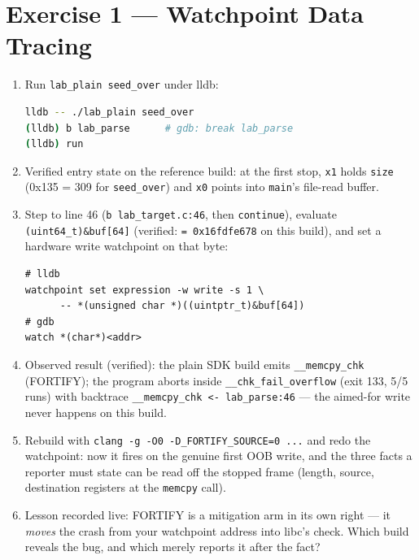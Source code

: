 \documentclass[12pt]{Training}
\begin{document}
\section*{Exercise 1 --- Watchpoint Data Tracing}
\begin{enumerate}
    \item Run \lstinline{lab_plain seed_over} under lldb:
    \begin{lstlisting}[language=bash]
lldb -- ./lab_plain seed_over
(lldb) b lab_parse      # gdb: break lab_parse
(lldb) run
    \end{lstlisting}
    \item Verified entry state on the reference build: at the first stop, \lstinline{x1} holds \lstinline{size} (0x135 = 309 for \lstinline{seed_over}) and \lstinline{x0} points into \lstinline{main}'s file-read buffer.
    \item Step to line 46 (\lstinline{b lab_target.c:46}, then \lstinline{continue}), evaluate \lstinline{(uint64_t)&buf[64]} (verified: \lstinline{= 0x16fdfe678} on this build), and set a hardware write watchpoint on that byte:
    \begin{lstlisting}
# lldb
watchpoint set expression -w write -s 1 \
      -- *(unsigned char *)((uintptr_t)&buf[64])
# gdb
watch *(char*)<addr>
    \end{lstlisting}
    \item Observed result (verified): the plain SDK build emits \lstinline{__memcpy_chk} (FORTIFY); the program aborts inside \lstinline{__chk_fail_overflow} (exit 133, 5/5 runs) with backtrace \lstinline{__memcpy_chk <- lab_parse:46} --- the aimed-for write never happens on this build.
    \item Rebuild with \lstinline{clang -g -O0 -D_FORTIFY_SOURCE=0 ...} and redo the watchpoint: now it fires on the genuine first OOB write, and the three facts a reporter must state can be read off the stopped frame (length, source, destination registers at the \lstinline{memcpy} call).
    \item Lesson recorded live: FORTIFY is a mitigation arm in its own right --- it \emph{moves} the crash from your watchpoint address into libc's check. Which build reveals the bug, and which merely reports it after the fact?
\end{enumerate}
\end{document}
